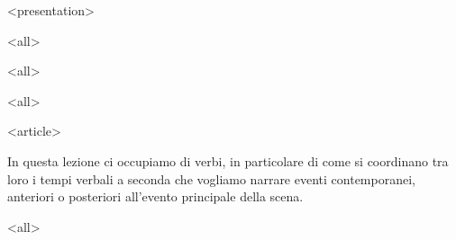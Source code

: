 \usepackage[italian]{babel}

\mode
<presentation>
{
}

\mode
<all>




\def\myplace{http://www.writersdream.org}

\date{\today}

\setcounter{tocdepth}{1}


\def\banner{banner-skylitzes.png}


\mode
<all>


\newcommand\slidegrid[4]{
    \color{#1}
    \setcounter{gridoriz}{#3+1}
    \setcounter{gridvert}{#4+1}
    \setcounter{gridorizlen}{#3*#2}
    \setcounter{gridvertlen}{#4*#2}
    \multiput(0,0)(#2,0){\value{gridoriz}}{\line(0,1){\value{gridvertlen}}}
    \multiput(0,0)(0,#2){\value{gridvert}}{\line(1,0){\value{gridorizlen}}}
}

\newcommand\includeimg[3]{\resizebox{#1}{#2}{\texttt{[image: \#3]}}}



\openpresentazione

\mode
<all>

\mode
<article>

In questa  lezione ci occupiamo  di verbi,  in particolare di  come si
coordinano tra  loro i  tempi verbali a  seconda che  vogliamo narrare
eventi  contemporanei, anteriori  o  posteriori all'evento  principale
della scena.

\mode
<all>


